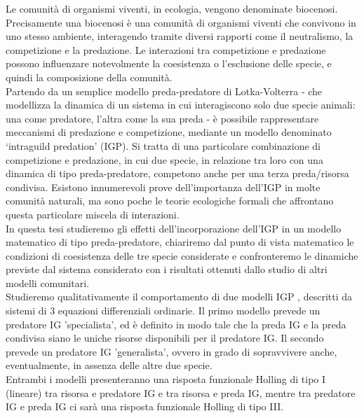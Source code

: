 \documentclass[12pt,oneside]{report}
\begin{document}
Le comunità di organismi viventi, in ecologia, vengono denominate biocenosi. 
Precisamente una biocenosi è una comunità di organismi viventi che convivono in uno stesso ambiente, interagendo tramite diversi rapporti come il neutralismo, la competizione e la predazione. 
Le interazioni tra competizione e predazione possono influenzare notevolmente la coesistenza o l’esclusione delle specie, e quindi la composizione della comunità.\\
Partendo da un semplice modello preda-predatore di Lotka-Volterra - che modellizza la dinamica di un sistema in cui interagiscono solo due specie animali: una come predatore, l’altra come la sua preda -
è possibile rappresentare meccanismi di predazione e competizione, mediante un modello denominato ‘intraguild predation' (IGP).
Si tratta di una particolare combinazione di competizione e predazione, in cui due specie, in relazione tra loro con una dinamica di tipo preda-predatore,  competono anche per una terza preda/risorsa condivisa. 
Esistono innumerevoli prove dell'importanza dell'IGP in molte comunità naturali, ma sono poche le teorie ecologiche formali che affrontano questa particolare miscela di interazioni.\\
In questa tesi studieremo gli effetti dell'incorporazione dell'IGP in un modello matematico di tipo preda-predatore, chiariremo dal punto di vista matematico le condizioni di coesistenza delle tre specie considerate e confronteremo le dinamiche previste dal sistema considerato con i risultati ottenuti dallo studio di altri modelli comunitari.\\
Studieremo qualitativamente il comportamento di due modelli IGP \cite{1}, descritti da sistemi di 3 equazioni differenziali ordinarie. Il primo modello prevede un predatore IG 'specialista', ed è definito in modo tale che la preda IG e la preda condivisa siano le uniche risorse disponibili per il predatore IG. Il secondo prevede un predatore IG 'generalista', ovvero in grado di sopravvivere anche, eventualmente, in assenza delle altre due specie.\\
Entrambi i modelli presenteranno una risposta funzionale Holling di tipo I (lineare) tra risorsa e predatore IG e tra risorsa e preda IG, mentre tra predatore IG e preda IG ci sarà una risposta funzionale Holling di tipo III.\\
\end{document}
